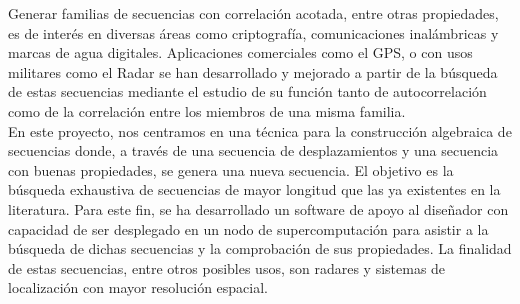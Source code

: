 Generar familias de secuencias con correlación acotada, entre otras
propiedades, es de interés en diversas áreas como criptografía, comunicaciones
inalámbricas y marcas de agua digitales. Aplicaciones comerciales como el GPS,
o con usos militares como el Radar se han desarrollado y mejorado  a partir de la
búsqueda de estas secuencias mediante el estudio de su función tanto de
autocorrelación como de la correlación entre los miembros de una misma familia.\\

En este proyecto, nos centramos en una técnica para la
construcción algebraica de secuencias donde, a través de una secuencia de
desplazamientos y una secuencia con buenas propiedades, se genera una nueva
secuencia. El objetivo es la búsqueda exhaustiva de secuencias de mayor
longitud que las ya existentes en la literatura. Para este fin, se ha
desarrollado un software de apoyo al diseñador con capacidad de ser desplegado
en un nodo de supercomputación para asistir a la búsqueda de dichas secuencias
y la comprobación de sus propiedades. La finalidad de estas secuencias, entre
otros posibles usos, son radares y sistemas de localización con mayor resolución
espacial.\\
